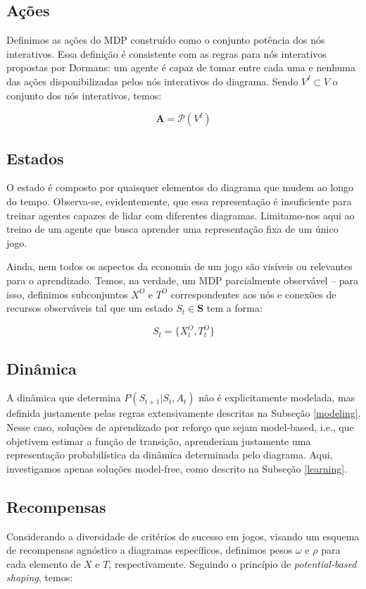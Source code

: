 \documentclass[conference]{IEEEtran}
\begin{document}
\subsection{Ações}

Definimos as ações do MDP construído como o conjunto potência dos nós interativos. Essa definição é consistente com as regras para nós interativos propostas por Dormans: um agente é capaz de tomar entre cada uma e nenhuma das ações disponibilizadas pelos nós interativos do diagrama. Sendo $V^I \subset V$ o conjunto dos nós interativos, temos:

$$
\mathbf{A} = \mathcal{P}(V^I)
$$

\subsection{Estados}

O estado é composto por quaisquer elementos do diagrama que mudem ao longo do tempo. Observa-se, evidentemente, que essa representação é insuficiente para treinar agentes capazes de lidar com diferentes diagramas. Limitamo-nos aqui ao treino de um agente que busca aprender uma representação fixa de um único jogo.

Ainda, nem todos os aspectos da economia de um jogo são visíveis ou relevantes para o aprendizado. Temos, na verdade, um MDP parcialmente observável -- para isso, definimos subconjuntos $X^O$ e $T^O$ correspondentes aos nós e conexões de recursos observáveis tal que um estado $S_t \in \mathbf{S}$ tem a forma:

$$
S_t = \{X^O_t, T^O_t\}
$$

\subsection{Dinâmica}

A dinâmica que determina $P(S_{t+1}|S_t, A_t)$ não é explicitamente modelada, mas definida justamente pelas regras extensivamente descritas na Subseção \ref{modeling}. Nesse caso, soluções de aprendizado por reforço que sejam model-based, i.e., que objetivem estimar a função de transição, aprenderiam justamente uma representação probabilística da dinâmica determinada pelo diagrama. Aqui, investigamos apenas soluções model-free, como descrito na Subseção \ref{learning}.

\subsection{Recompensas}
Considerando a diversidade de critérios de sucesso em jogos, visando um esquema de recompensas agnóstico a diagramas específicos, definimos pesos $\omega$ e $\rho$ para cada elemento de $X$ e $T$, respectivamente. Seguindo o princípio de \textit{potential-based shaping}\cite{potential-rl}, temos:
\end{document}
